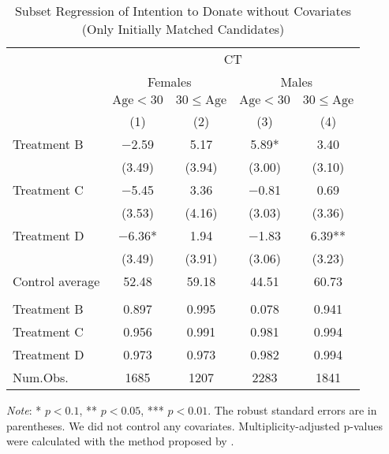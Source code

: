 \documentclass[12pt, a4paper]{article}
\begin{document}
\begin{table}[H]

\caption{\label{tab:lm-positive-subset1-init}Subset Regression of Intention to Donate without Covariates (Only Initially Matched Candidates)}
\centering
\fontsize{8}{10}\selectfont
\begin{threeparttable}
\begin{tabular}[t]{lcccc}
\toprule
\multicolumn{1}{c}{ } & \multicolumn{4}{c}{CT} \\
\cmidrule(l{3pt}r{3pt}){2-5}
\multicolumn{1}{c}{ } & \multicolumn{2}{c}{Females} & \multicolumn{2}{c}{Males} \\
\cmidrule(l{3pt}r{3pt}){2-3} \cmidrule(l{3pt}r{3pt}){4-5}
\multicolumn{1}{c}{ } & \multicolumn{1}{c}{$\text{Age} < 30$} & \multicolumn{1}{c}{$30 \le \text{Age}$} & \multicolumn{1}{c}{$\text{Age} < 30$} & \multicolumn{1}{c}{$30 \le \text{Age}$} \\
\cmidrule(l{3pt}r{3pt}){2-2} \cmidrule(l{3pt}r{3pt}){3-3} \cmidrule(l{3pt}r{3pt}){4-4} \cmidrule(l{3pt}r{3pt}){5-5}
  & (1) & (2) & (3) & (4)\\
\midrule
Treatment B & \num{-2.59} & \num{5.17} & \num{5.89}* & \num{3.40}\\
 & (\num{3.49}) & (\num{3.94}) & (\num{3.00}) & (\num{3.10})\\
Treatment C & \num{-5.45} & \num{3.36} & \num{-0.81} & \num{0.69}\\
 & (\num{3.53}) & (\num{4.16}) & (\num{3.03}) & (\num{3.36})\\
Treatment D & \num{-6.36}* & \num{1.94} & \num{-1.83} & \num{6.39}**\\
 & (\num{3.49}) & (\num{3.91}) & (\num{3.06}) & (\num{3.23})\\
\midrule
Control average & 52.48 & 59.18 & 44.51 & 60.73\\
\addlinespace[0.3em]
\multicolumn{5}{l}{\textit{Multiplicity-adjusted p-values}}\\
\hspace{1em}Treatment B & 0.897 & 0.995 & 0.078 & 0.941\\
\hspace{1em}Treatment C & 0.956 & 0.991 & 0.981 & 0.994\\
\hspace{1em}Treatment D & 0.973 & 0.973 & 0.982 & 0.994\\
Num.Obs. & \num{1685} & \num{1207} & \num{2283} & \num{1841}\\
\bottomrule
\end{tabular}
\begin{tablenotes}
\item \emph{Note}: * $p < 0.1$, ** $p < 0.05$, *** $p < 0.01$. The robust standard errors are in parentheses. We did not control any covariates. Multiplicity-adjusted p-values were calculated with the method proposed by \cite{List2019}.
\end{tablenotes}
\end{threeparttable}
\end{table}
\end{document}
